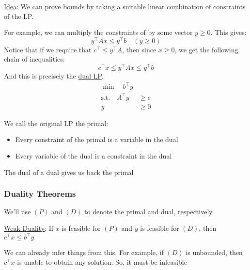 \underline{Idea}: We can prove bounds by taking a suitable linear combination of constraints of the LP.

For example, we can multiply the constraints of  by some vector $y \geq 0$. This gives:
\begin{equation*}
    y^\intercal Ax \leq y^\intercal b \quad (y \geq 0)
\end{equation*}
Notice that if we require that $c^\intercal \leq y^\intercal A$, then since $x \geq 0$, we get the following chain of inequalities:
\begin{equation*}
    c^\intercal x \leq y^\intercal Ax \leq y^\intercal b 
\end{equation*}
And this is precisely the \underline{dual LP}.
\begin{equation}\label{eq:intro-review-lp-dual}
\begin{aligned}
    \min \quad b^\intercal y & \\
    \text{s.t.} \quad A^\intercal y &\geq c \\
    y &\geq 0
\end{aligned}
\end{equation}

We call the original LP the primal:
\begin{itemize}
    \item Every constraint of the primal is a variable in the dual
    \item Every variable of the dual is a constraint in the dual
\end{itemize}

\begin{remark}{}{}
    The dual of a dual gives us back the primal
\end{remark}

\subsubsection{Duality Theorems}
We'll use $(P)$ and $(D)$ to denote the primal and dual, respectively.

\underline{Weak Duality}:
If $x$ is feasible for $(P)$ and $y$ is feasible for $(D)$, then $c^\intercal x \leq b^\intercal y$

\begin{note}
    We can already infer things from this. For example, if $(D)$ is unbounded, then $c^\intercal x$ is unable to obtain any solution. So, it must be infeasible
\end{note}

